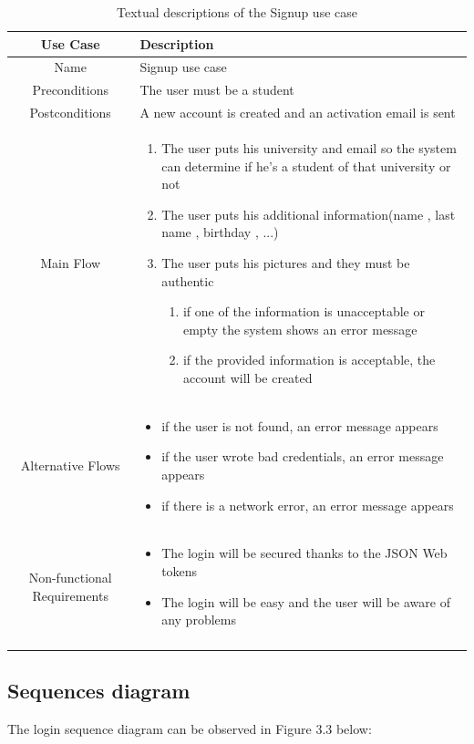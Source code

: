\begin{longtable}{|c|p{10cm}|}
\hline
Use Case & Description \\\hline
Name & Signup use case \\\hline
Preconditions & The user must be a student \\\hline
Postconditions & A new account is created and an activation email is sent \\ \hline
Main Flow & \begin{enumerate}
    \item The user puts his university and email so the system can determine if he's a student of that university or not
    \item The user puts his additional information(name , last name , birthday , ...) 
    \item The user puts his pictures and they must be authentic 
    \begin{enumerate}
        \item if one of the information is unacceptable or empty the system shows an error message
        \item if the provided information is acceptable, the account will be created
    \end{enumerate}    
\end{enumerate}
\\\hline
Alternative Flows & \begin{itemize}
    \item if the user is not found, an error message appears
    \item if the user wrote bad credentials, an error message appears
    \item if there is a network error, an error message appears
\end{itemize}
\\\hline
Non-functional Requirements & \begin{itemize}
    \item The login will be secured thanks to the JSON Web tokens
    \item The login will be easy and the user will be aware of any problems
\end{itemize}
\\\hline
\caption{Textual descriptions of the Signup use case}
\label{Tab: Textual descriptions of the Signup use case}
\end{longtable}

\subsection{Sequences diagram}
The login sequence diagram can be observed in Figure 3.3 below:

